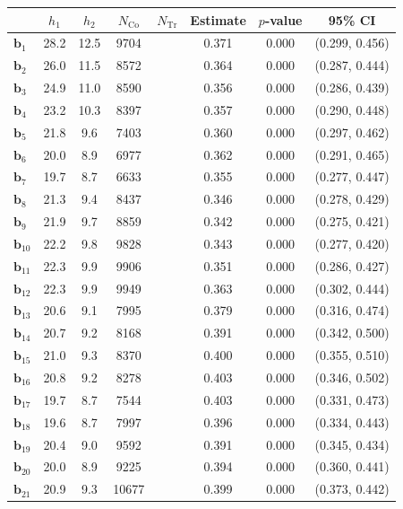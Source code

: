 \documentclass[10pt]{article}
\newcommand{\bb}{\mathbf{b}}
\begin{document}
\begin{table}[p]
    \centering
\begin{tabular}{lccccccc}
  \toprule\toprule
   & $h_1$ & $h_2$ & $N_{\mathrm{Co}}$ & $N_{\mathrm{Tr}}$ & Estimate & $p$-value & 95\% CI \\
  \midrule
   $\bb_{1}$ & 28.2 & 12.5 & 9704 &  & 0.371 & 0.000 & (0.299, 0.456)\\
   $\bb_{2}$ & 26.0 & 11.5 & 8572 &  & 0.364 & 0.000 & (0.287, 0.444)\\
   $\bb_{3}$ & 24.9 & 11.0 & 8590 &  & 0.356 & 0.000 & (0.286, 0.439)\\
   $\bb_{4}$ & 23.2 & 10.3 & 8397 &  & 0.357 & 0.000 & (0.290, 0.448)\\
   $\bb_{5}$ & 21.8 & 9.6 & 7403 &  & 0.360 & 0.000 & (0.297, 0.462)\\
   $\bb_{6}$ & 20.0 & 8.9 & 6977 &  & 0.362 & 0.000 & (0.291, 0.465)\\
   $\bb_{7}$ & 19.7 & 8.7 & 6633 &  & 0.355 & 0.000 & (0.277, 0.447)\\
   $\bb_{8}$ & 21.3 & 9.4 & 8437 &  & 0.346 & 0.000 & (0.278, 0.429)\\
   $\bb_{9}$ & 21.9 & 9.7 & 8859 &  & 0.342 & 0.000 & (0.275, 0.421)\\
   $\bb_{10}$ & 22.2 & 9.8 & 9828 &  & 0.343 & 0.000 & (0.277, 0.420)\\
   $\bb_{11}$ & 22.3 & 9.9 & 9906 &  & 0.351 & 0.000 & (0.286, 0.427)\\
   $\bb_{12}$ & 22.3 & 9.9 & 9949 &  & 0.363 & 0.000 & (0.302, 0.444)\\
   $\bb_{13}$ & 20.6 & 9.1 & 7995 &  & 0.379 & 0.000 & (0.316, 0.474)\\
   $\bb_{14}$ & 20.7 & 9.2 & 8168 &  & 0.391 & 0.000 & (0.342, 0.500)\\
   $\bb_{15}$ & 21.0 & 9.3 & 8370 &  & 0.400 & 0.000 & (0.355, 0.510)\\
   $\bb_{16}$ & 20.8 & 9.2 & 8278 &  & 0.403 & 0.000 & (0.346, 0.502)\\
   $\bb_{17}$ & 19.7 & 8.7 & 7544 &  & 0.403 & 0.000 & (0.331, 0.473)\\
   $\bb_{18}$ & 19.6 & 8.7 & 7997 &  & 0.396 & 0.000 & (0.334, 0.443)\\
   $\bb_{19}$ & 20.4 & 9.0 & 9592 &  & 0.391 & 0.000 & (0.345, 0.434)\\
   $\bb_{20}$ & 20.0 & 8.9 & 9225 &  & 0.394 & 0.000 & (0.360, 0.441)\\
   $\bb_{21}$ & 20.9 & 9.3 & 10677 &  & 0.399 & 0.000 & (0.373, 0.442)\\

\end{tabular}
\end{table}
\end{document}
